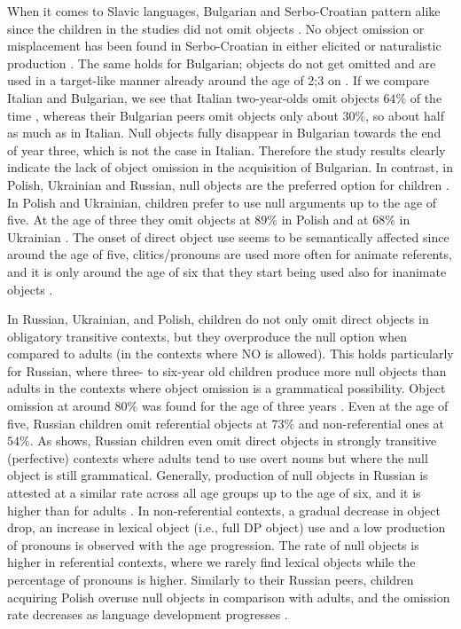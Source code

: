 \documentclass[output=paper,modfonts,newtxmath,hidelinks,]{langscibook}
\begin{document}
When it comes to Slavic languages, Bulgarian and Serbo-Croatian pattern alike since the children in the studies did not omit objects \citep{Radeva-Bork2013,Radeva-Bork2015,Stiasny2006}. No object omission or misplacement has been found in Serbo-Croatian in either elicited or naturalistic production \citep{Stiasny2006}. The same holds for Bulgarian; objects do not get omitted and are used in a target-like manner already around the age of 2;3 on \citep{Radeva-Bork2015}. If we compare Italian and Bulgarian, we see that Italian two-year-olds omit objects $64\%$ of the time \citep{Schaeffer2000}, whereas their Bulgarian peers omit objects only about $30\%$, so about half as much as in Italian. Null objects fully disappear in Bulgarian towards the end of year three, which is not the case in Italian. Therefore the study results clearly indicate the lack of object omission in the acquisition of Bulgarian. In contrast, in Polish, Ukrainian and Russian, null objects are the preferred option for children \citep{Tryzna2015,Mykhaylyk-Sopata2016,Gordishevsky-Avrutin2004,Frolova2016}. In Polish and Ukrainian, children prefer to use null arguments up to the age of five. At the age of three they omit objects at $89\%$ in Polish and at $68\%$ in Ukrainian \citep{Mykhaylyk-Sopata2016}. The onset of direct object use seems to be semantically affected since around the age of five, clitics/pronouns are used more often for animate referents, and it is only around the age of six that they start being used also for inanimate objects \citep{Mykhaylyk-Sopata2016}.

In Russian, Ukrainian, and Polish, children do not only omit direct objects in obligatory transitive contexts, but they overproduce the null option when compared to adults (in the contexts where NO is allowed). This holds particularly for Russian, where three- to six-year old children produce more null objects than adults in the contexts where object omission is a grammatical possibility. Object omission at around $80\%$ was found for the age of three years \citep{Frolova2016}. Even at the age of five, Russian children omit referential objects at $73\%$ and non-referential ones at $54\%$. As \citet{Frolova} shows, Russian children even omit direct objects in strongly transitive (perfective) contexts where adults tend to use overt nouns but where the null object is still grammatical. Generally, production of null objects in Russian is attested at a similar rate across all age groups up to the age of six, and it is higher than for adults \citep{Frolova2016}. In non-referential contexts, a gradual decrease in object drop, an increase in lexical object (i.e., full DP object) use and a low production of pronouns is observed with the age progression. The rate of null objects is higher in referential contexts, where we rarely find lexical objects while the percentage of pronouns is higher. Similarly to their Russian peers, children acquiring Polish overuse null objects in comparison with adults, and the omission rate decreases as language development progresses \citep{Mykhaylyk-Sopata2016,Tryzna2015}.
\end{document}

